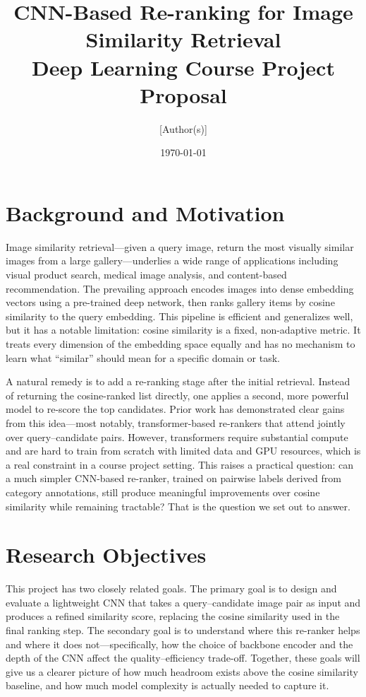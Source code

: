 \documentclass[12pt]{article}
\title{\textbf{CNN-Based Re-ranking for Image Similarity Retrieval}\\[0.4em]
\large Deep Learning Course Project Proposal}
\author{[Author(s)]}
\date{\today}
\begin{document}
\maketitle

\section{Background and Motivation}

Image similarity retrieval---given a query image, return the most visually similar images from a large gallery---underlies a wide range of applications including visual product search, medical image analysis, and content-based recommendation. The prevailing approach encodes images into dense embedding vectors using a pre-trained deep network, then ranks gallery items by cosine similarity to the query embedding. This pipeline is efficient and generalizes well, but it has a notable limitation: cosine similarity is a fixed, non-adaptive metric. It treats every dimension of the embedding space equally and has no mechanism to learn what ``similar'' should mean for a specific domain or task.

A natural remedy is to add a re-ranking stage after the initial retrieval. Instead of returning the cosine-ranked list directly, one applies a second, more powerful model to re-score the top candidates. Prior work has demonstrated clear gains from this idea---most notably, transformer-based re-rankers that attend jointly over query--candidate pairs. However, transformers require substantial compute and are hard to train from scratch with limited data and GPU resources, which is a real constraint in a course project setting. This raises a practical question: can a much simpler CNN-based re-ranker, trained on pairwise labels derived from category annotations, still produce meaningful improvements over cosine similarity while remaining tractable? That is the question we set out to answer.

\section{Research Objectives}

This project has two closely related goals. The primary goal is to design and evaluate a lightweight CNN that takes a query--candidate image pair as input and produces a refined similarity score, replacing the cosine similarity used in the final ranking step. The secondary goal is to understand where this re-ranker helps and where it does not---specifically, how the choice of backbone encoder and the depth of the CNN affect the quality--efficiency trade-off. Together, these goals will give us a clearer picture of how much headroom exists above the cosine similarity baseline, and how much model complexity is actually needed to capture it.
\end{document}
